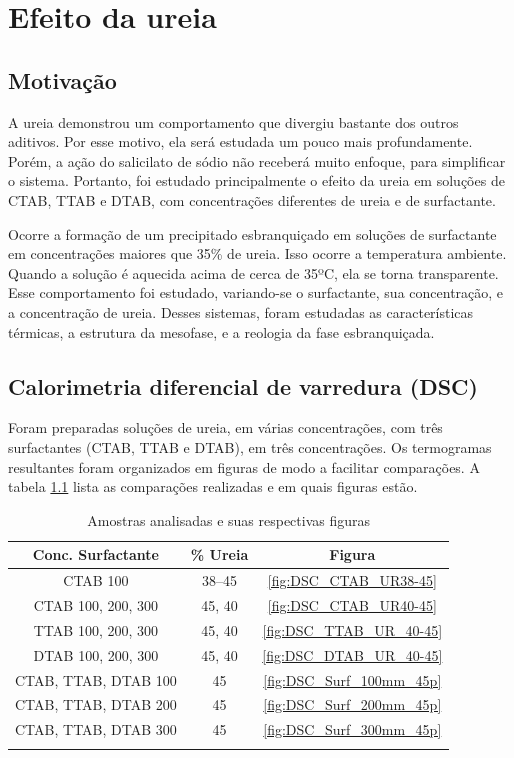 \chapter{Efeito da ureia}
	\section{Motivação}
	A ureia demonstrou um comportamento que divergiu bastante dos outros aditivos. Por esse motivo, ela será estudada um pouco mais profundamente. Porém, a ação do salicilato de sódio não receberá muito enfoque, para simplificar o sistema. Portanto, foi estudado principalmente o efeito da ureia em soluções de CTAB, TTAB e DTAB, com concentrações diferentes de ureia e de surfactante.
	
	Ocorre a formação de um precipitado esbranquiçado em soluções de surfactante em concentrações maiores que 35\% de ureia. Isso ocorre a temperatura ambiente. Quando a solução é aquecida acima de cerca de 35ºC, ela se torna transparente. Esse comportamento foi estudado, variando-se o surfactante, sua concentração, e a concentração de ureia. Desses sistemas, foram estudadas as características térmicas, a estrutura da mesofase, e a reologia da fase esbranquiçada.
	
	\section{Calorimetria diferencial de varredura (DSC)}
		Foram preparadas soluções de ureia, em várias concentrações, com três surfactantes (CTAB, TTAB e DTAB), em três concentrações. Os termogramas resultantes foram organizados em figuras de modo a facilitar comparações. A tabela \ref{tab:refs_DSC} lista as comparações realizadas e em quais figuras estão.
		
		\begin{longtable}[h]{c c c}
			\toprule
			Conc. Surfactante \mM     & \% Ureia		& Figura 			\\
			\midrule
			CTAB 100	  & 38--45			& \ref{fig:DSC_CTAB_UR38-45}	\\
			CTAB 100, 200, 300	& 45, 40	& \ref{fig:DSC_CTAB_UR40-45}	\\
			TTAB 100, 200, 300	& 45, 40	& \ref{fig:DSC_TTAB_UR_40-45}	\\
			DTAB 100, 200, 300	& 45, 40	& \ref{fig:DSC_DTAB_UR_40-45}	\\
			CTAB, TTAB, DTAB 100	& 45	& \ref{fig:DSC_Surf_100mm_45p}	\\
			CTAB, TTAB, DTAB 200	& 45	& \ref{fig:DSC_Surf_200mm_45p}	\\
			CTAB, TTAB, DTAB 300	& 45	& \ref{fig:DSC_Surf_300mm_45p}	\\
			\bottomrule
			\label{tab:refs_DSC}
			\caption{Amostras analisadas e suas respectivas figuras}
		\end{longtable}
		
